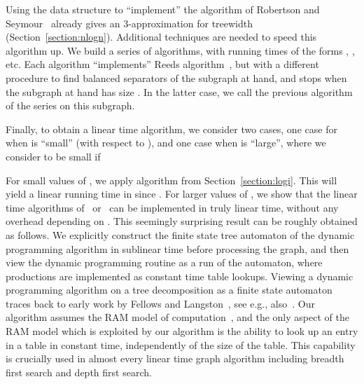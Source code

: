 \documentclass[a4paper,11pt]{article}
\theoremstyle{definition}
\theoremstyle{remark}
\begin{document}
Using the data structure to ``implement'' the algorithm of Robertson
and Seymour~\cite{RobertsonS13} already gives an 
3-approximation for treewidth (Section~\ref{section:nlogn}).
Additional techniques are needed to speed this algorithm up.  We build
a series of algorithms, with running times of the forms , , etc.  Each algorithm
``implements'' Reeds algorithm~\cite{Reed92}, but with a different
procedure to find balanced separators of the subgraph at hand, and
stops when the subgraph at hand has size .  In the latter
case, we call the previous algorithm of the series on this subgraph.


Finally, to obtain a linear time algorithm, we consider two cases, one
case for when  is ``small'' (with respect to ), and one case
when  is ``large'', where we consider  to be small if

For small values of , we apply  algorithm
from Section~\ref{section:logi}.  This will yield a linear running
time in  since .  For larger values of , we
show that the linear time algorithms of~\cite{Bodlaender96}
or~\cite{PerkovicR00} can be implemented in truly linear time, without any overhead depending on . This seemingly surprising result can be roughly obtained as follows. 
We explicitly construct the finite state tree automaton of the dynamic
programming algorithm in sublinear time before processing the graph, and then view the dynamic programming routine as a run of the automaton, where productions are implemented as constant time table lookups. Viewing a dynamic programming algorithm on a tree decomposition as a finite state automaton traces
back to early work by Fellows and Langston~\cite{FellowsL89}, see e.g., also~\cite{AbrahamsonF93}. Our algorithm assumes the RAM model of computation~\cite{SavageBook}, and the only aspect of the RAM model which is exploited by our algorithm is the ability to look up an entry in a table in constant time, independently of the size of the table. This capability is crucially used in almost every linear time graph algorithm including breadth first search and depth first search.
\end{document}
